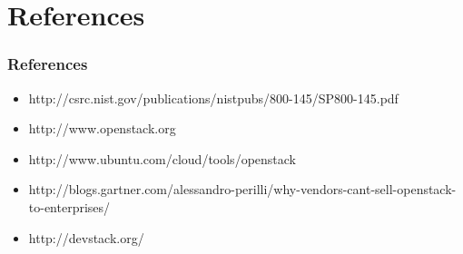 \section*{References}
  \begin{frame}
    \frametitle{References}
    \begin{itemize}
      \item http://csrc.nist.gov/publications/nistpubs/800-145/SP800-145.pdf
      \item http://www.openstack.org
      \item http://www.ubuntu.com/cloud/tools/openstack
      \item http://blogs.gartner.com/alessandro-perilli/why-vendors-cant-sell-openstack-to-enterprises/
      \item http://devstack.org/
    \end{itemize}

  \end{frame}